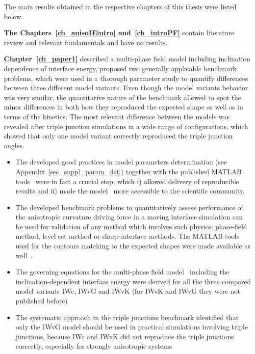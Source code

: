 The main results obtained in the respective chapters of this thesis were listed below.

\textbf{The Chapters~\ref{ch_anisoIEintro} and~\ref{ch_introPF}} contain literature review and relevant fundamentals and have no results.

\textbf{Chapter~\ref{ch_paper1}} described a multi-phase field model including inclination dependence of interface energy, proposed two  generally applicable benchmark problems, which were used in a thorough parameter study to quantify differences between three different model variants. Even though the model variants behavior was very similar, the quantitative nature of the benchmark allowed to spot the minor differences in both how they reproduced the expected shape as well as in terms of the kinetics. The most relevant difference between the models was revealed after triple junction simulations in a wide range of configurations, which showed that only one model variant correctly reproduced the triple junction angles.
\begin{itemize}
	\item The developed good practices in model parameters determination (see Appendix~\ref{sec_suppl_param_det}) together with the published MATLAB tools~\cite{Minar2022dataset} were in fact a crucial step, which i) allowed delivery of reproducible results and ii) made the model~\cite{Moelans2008} more accessible to the scientific community.
	\item The developed benchmark problems to quantitatively assess performance of the anisotropic curvature driving force in a moving interface simulation can be used for validation of any method which involves such physics: phase-field method, level set method or sharp-interface methods. The MATLAB tools used for the contours matching to the expected shapes were made available as well~\cite{Minar2022dataset}.
	\item The governing equations for the multi-phase field model~\cite{Moelans2008} including the inclination-dependent interface energy were derived for all the three compared model variants IWc, IWvG and IWvK (for IWvK and IWvG they were not published before)
	\item The systematic approach in the triple junctions benchmark identified that only the IWvG model should be used in practical simulations involving triple junctions, because IWc and IWvK did not reproduce the triple junctions correctly, especially for strongly anisotropic systems
\end{itemize}

